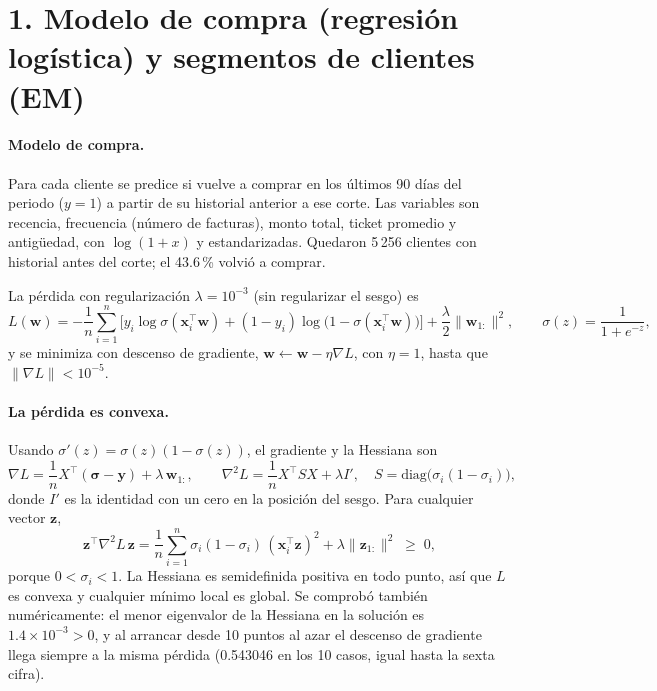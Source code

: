 \section*{1. Modelo de compra (regresión logística) y segmentos de clientes (EM)}
\label{p2:sec:p1}

\paragraph{Modelo de compra.} Para cada cliente se predice si vuelve a comprar en los últimos 90 días del periodo ($y=1$) a partir de su historial anterior a ese corte. Las variables son recencia, frecuencia (número de facturas), monto total, ticket promedio y antigüedad, con $\log(1+x)$ y estandarizadas. Quedaron 5\,256 clientes con historial antes del corte; el 43.6\,\% volvió a comprar.

La pérdida con regularización $\lambda=10^{-3}$ (sin regularizar el sesgo) es
\[ L(\mathbf w) = -\frac1n\sum_{i=1}^n\Big[y_i\log\sigma(\mathbf x_i^\top\mathbf w)+(1-y_i)\log\big(1-\sigma(\mathbf x_i^\top\mathbf w)\big)\Big] + \frac{\lambda}{2}\|\mathbf w_{1:}\|^2, \qquad \sigma(z)=\frac{1}{1+e^{-z}}, \]
y se minimiza con descenso de gradiente, $\mathbf w\gets\mathbf w-\eta\nabla L$, con $\eta=1$, hasta que $\|\nabla L\|<10^{-5}$.

\paragraph{La pérdida es convexa.} Usando $\sigma'(z)=\sigma(z)(1-\sigma(z))$, el gradiente y la Hessiana son
\[ \nabla L = \frac1n X^\top(\boldsymbol\sigma-\mathbf y)+\lambda\,\mathbf w_{1:}, \qquad
   \nabla^2 L = \frac1n X^\top S X + \lambda I', \quad S=\mathrm{diag}\big(\sigma_i(1-\sigma_i)\big), \]
donde $I'$ es la identidad con un cero en la posición del sesgo. Para cualquier vector $\mathbf z$,
\[ \mathbf z^\top\nabla^2 L\,\mathbf z = \frac1n\sum_{i=1}^n \sigma_i(1-\sigma_i)\,(\mathbf x_i^\top\mathbf z)^2 + \lambda\|\mathbf z_{1:}\|^2 \;\ge\; 0, \]
porque $0<\sigma_i<1$. La Hessiana es semidefinida positiva en todo punto, así que $L$ es convexa y cualquier mínimo local es global. Se comprobó también numéricamente: el menor eigenvalor de la Hessiana en la solución es $1.4\times10^{-3}>0$, y al arrancar desde 10 puntos al azar el descenso de gradiente llega siempre a la misma pérdida (0.543046 en los 10 casos, igual hasta la sexta cifra).

